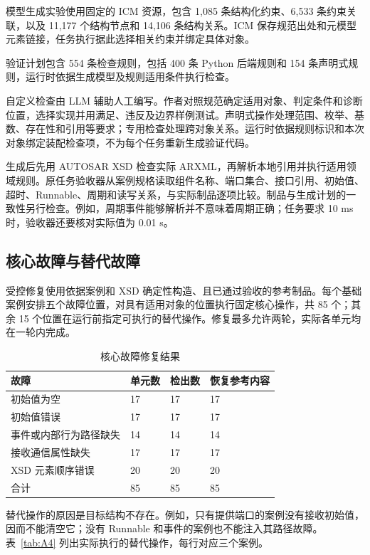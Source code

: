 \documentclass[pdflatex,iicol,sn-mathphys-num]{sn-jnl}
\begin{document}
模型生成实验使用固定的 ICM 资源，包含 1,085 条结构化约束、6,533 条约束关联，以及 11,177 个结构节点和 14,106 条结构关系。ICM 保存规范出处和元模型元素链接，任务执行据此选择相关约束并绑定具体对象。


验证计划包含 554 条检查规则，包括 400 条 Python 后端规则和 154 条声明式规则，运行时依据生成模型及规则适用条件执行检查。


自定义检查由 LLM 辅助人工编写。作者对照规范确定适用对象、判定条件和诊断位置，选择实现并用满足、违反及边界样例测试。声明式操作处理范围、枚举、基数、存在性和引用等要求；专用检查处理跨对象关系。运行时依据规则标识和本次对象绑定装配检查项，不为每个任务重新生成验证代码。


生成后先用 AUTOSAR XSD 检查实际 ARXML，再解析本地引用并执行适用领域规则。原任务验收器从案例规格读取组件名称、端口集合、接口引用、初始值、超时、Runnable、周期和读写关系，与实际制品逐项比较。制品与生成计划的一致性另行检查。例如，周期事件能够解析并不意味着周期正确；任务要求 10 ms 时，验收器还要核对实际值为 0.01 s。


\subsection{核心故障与替代故障}\label{app:A-3}

受控修复使用依据案例和 XSD 确定性构造、且已通过验收的参考制品。每个基础案例安排五个故障位置，对具有适用对象的位置执行固定核心操作，共 85 个；其余 15 个位置在运行前指定可执行的替代操作。修复最多允许两轮，实际各单元均在一轮内完成。


\begin{table}[!tbp]
\centering
\caption{核心故障修复结果}\label{tab:A3}
\small
\setlength{\tabcolsep}{4pt}
\renewcommand{\arraystretch}{1.20}
\begin{tabularx}{\textwidth}{@{}L L L L@{}}
\toprule
\textbf{故障} & \textbf{单元数} & \textbf{检出数} & \textbf{恢复参考内容} \\
\midrule
初始值为空 & 17 & 17 & 17 \\
初始值错误 & 17 & 17 & 17 \\
事件或内部行为路径缺失 & 14 & 14 & 14 \\
接收通信属性缺失 & 17 & 17 & 17 \\
XSD 元素顺序错误 & 20 & 20 & 20 \\
合计 & 85 & 85 & 85 \\
\bottomrule
\end{tabularx}
\end{table}

替代操作的原因是目标结构不存在。例如，只有提供端口的案例没有接收初始值，因而不能清空它；没有 Runnable 和事件的案例也不能注入其路径故障。表~\ref{tab:A4} 列出实际执行的替代操作，每行对应三个案例。
\end{document}
